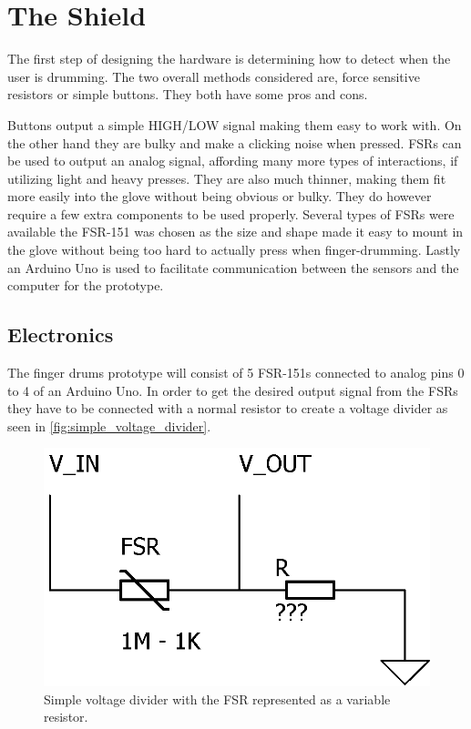 \chapter{The Shield}
\label{the_shield}
The first step of designing the hardware is determining how to detect when the user is drumming. The two overall methods considered are, force sensitive resistors or simple buttons. They both have some pros and cons. 

Buttons output a simple HIGH/LOW signal making them easy to work with. On the other hand they are bulky and make a clicking noise when pressed.
FSRs can be used to output an analog signal, affording many more types of interactions, if utilizing light and heavy presses. They are also much thinner, making them fit more easily into the glove without being obvious or bulky. They do however require a few extra components to be used properly. Several types of FSRs were available the FSR-151 was chosen as the size and shape made it easy to mount in the glove without being too hard to actually press when finger-drumming.
\blankline 
Lastly an Arduino Uno is used to facilitate communication between the sensors and the computer for the prototype. 

\section{Electronics}
\label{electronics}
The finger drums prototype will consist of 5 FSR-151s connected to analog pins 0 to 4 of an Arduino Uno. In order to get the desired output signal from the FSRs they have to be connected with a normal resistor to create a voltage divider as seen in \autoref{fig:simple_voltage_divider}. 

\begin{figure}[H]
\centering
\includegraphics[scale=1.5]{Figure/simple_voltage_divider.png}
\caption{Simple voltage divider with the FSR represented as a variable resistor. }
\label{fig:simple_voltage_divider}
\end{figure}

